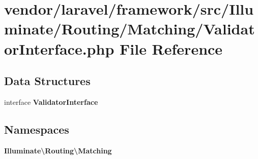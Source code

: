 \section{vendor/laravel/framework/src/\+Illuminate/\+Routing/\+Matching/\+Validator\+Interface.php File Reference}
\label{_validator_interface_8php}
\subsection*{Data Structures}
\begin{DoxyCompactItemize}
\item 
interface {\bf Validator\+Interface}
\end{DoxyCompactItemize}
\subsection*{Namespaces}
\begin{DoxyCompactItemize}
\item 
 {\bf Illuminate\textbackslash{}\+Routing\textbackslash{}\+Matching}
\end{DoxyCompactItemize}
